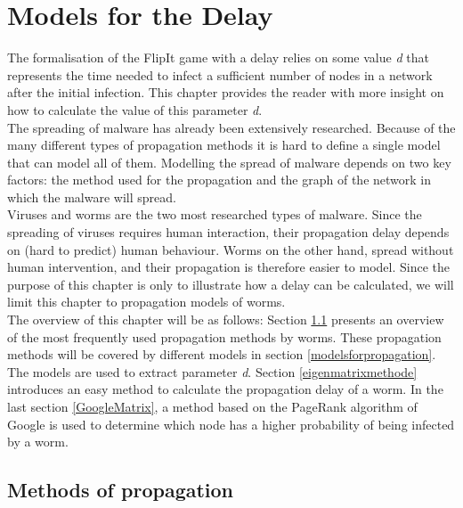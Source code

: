 \chapter{Models for the Delay}
\label{chapter4: Worm propagation}



The formalisation of the FlipIt game with a delay relies on some value  \textit{d} that represents the time needed to infect a sufficient number of nodes in a network after the initial infection. This chapter provides the reader with more insight on how to calculate the value of this parameter \textit{d}.  \\

The spreading of malware has already been extensively researched. Because of the many different types of propagation methods it is hard to define a single model that can model all of them. Modelling the spread of malware depends on two key factors: the method used for the propagation and the graph of the network in which the malware will spread. \\
Viruses and worms are the two most researched types of malware.
 Since the spreading of viruses requires human interaction, their propagation delay depends on (hard to predict) human behaviour. Worms on the other hand, spread without human intervention, and their propagation is therefore easier to model. Since the purpose of this chapter is only to illustrate how a delay can be calculated, we will limit this chapter to propagation models of worms. \\

The overview of this chapter will be as follows: Section \ref{methodsofpropagation} presents an overview of the most frequently used propagation methods by worms. These propagation methods will be covered by different models in section \ref{modelsforpropagation}. The models are used to extract parameter \textit{d}. Section \ref{eigenmatrixmethode} introduces an easy method to calculate the propagation delay of a worm. In the last section \ref{GoogleMatrix}, a method based on the PageRank algorithm of Google is used to determine which node has a higher probability of being infected by a worm. %



\section{Methods of propagation}
\label{methodsofpropagation}

